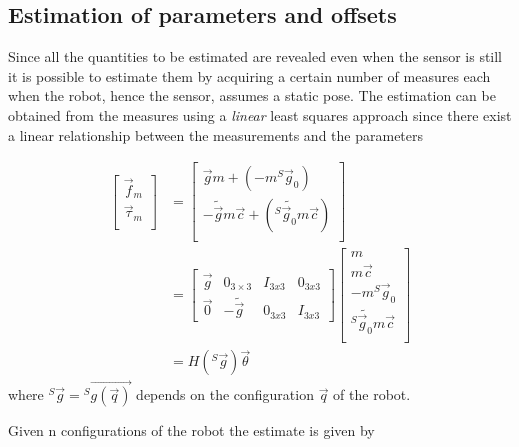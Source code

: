 \subsection{Estimation of parameters and offsets}
Since all the quantities to be estimated are revealed even when the sensor is still
it is possible to estimate them by acquiring a certain number of measures each when
the robot, hence the sensor, assumes a static pose. The estimation can be obtained
from the measures using a \emph{linear} least squares approach since there exist
a linear relationship between the measurements and the parameters

\[
\begin{split}
  \begin{bmatrix}
    \vec{f}_{m} \\
    \vec{\tau}_{m} \\
  \end{bmatrix} &=
  \begin{bmatrix}
    \vec{g} m + (-m {}^S \vec{g}_{0}) \\
    -\tilde{\vec{g}} m\vec{c} + ({}^S \tilde{\vec{g}_{0}} m\vec{c}) \\
  \end{bmatrix}\\
  & =
  \begin{bmatrix}
    \vec{g} & 0_{3 \times 3} & I_{3x3} & 0_{3x3} \\
    \vec{0} & -\tilde{\vec{g}} & 0_{3x3} & I_{3x3}
  \end{bmatrix}
  \begin{bmatrix}
    m \\
    m \vec{c} \\
    -m {}^S \vec{g}_{0} \\
    {}^S \tilde{\vec{g}_{0}} m\vec{c} \\
  \end{bmatrix}\\
  &=
  H({}^S \vec{g}) \vec{\theta}
\end{split}
\]
where ${}^S \vec{g} = {}^S \vec{g(\vec{q})}$ depends on the configuration $\vec{q}$ of the robot.
\par
Given n configurations of the robot the estimate is given by
